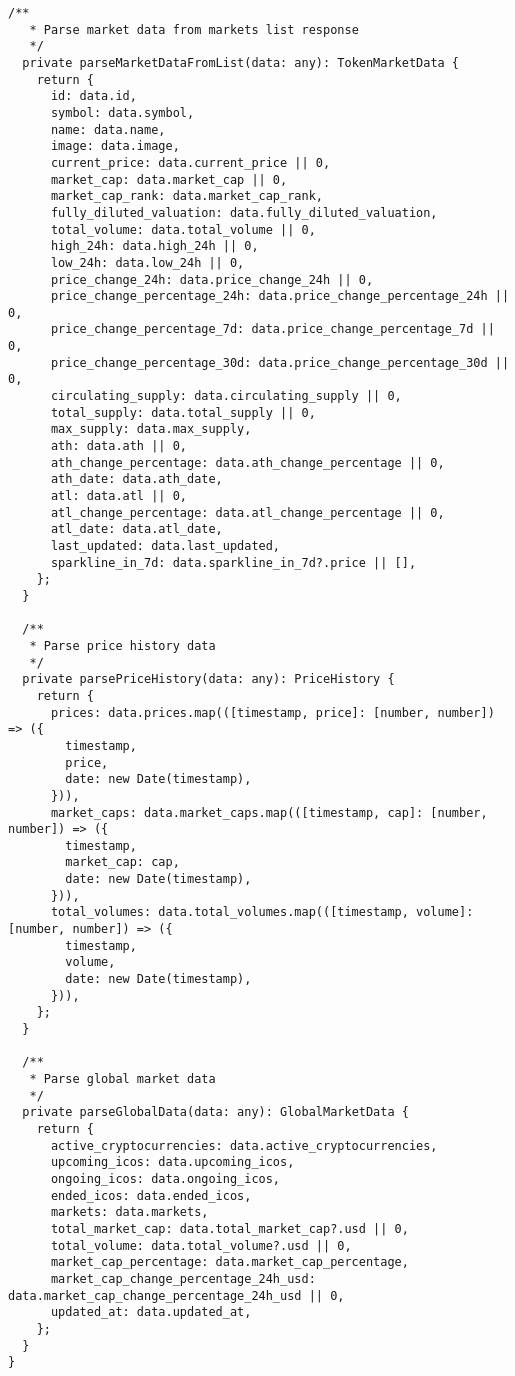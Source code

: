 \documentclass[11pt,a4paper]{article}
\begin{document}
\begin{lstlisting}[style=typescript, caption=CoinGecko Service for Market Data]
  /**
   * Parse market data from markets list response
   */
  private parseMarketDataFromList(data: any): TokenMarketData {
    return {
      id: data.id,
      symbol: data.symbol,
      name: data.name,
      image: data.image,
      current_price: data.current_price || 0,
      market_cap: data.market_cap || 0,
      market_cap_rank: data.market_cap_rank,
      fully_diluted_valuation: data.fully_diluted_valuation,
      total_volume: data.total_volume || 0,
      high_24h: data.high_24h || 0,
      low_24h: data.low_24h || 0,
      price_change_24h: data.price_change_24h || 0,
      price_change_percentage_24h: data.price_change_percentage_24h || 0,
      price_change_percentage_7d: data.price_change_percentage_7d || 0,
      price_change_percentage_30d: data.price_change_percentage_30d || 0,
      circulating_supply: data.circulating_supply || 0,
      total_supply: data.total_supply || 0,
      max_supply: data.max_supply,
      ath: data.ath || 0,
      ath_change_percentage: data.ath_change_percentage || 0,
      ath_date: data.ath_date,
      atl: data.atl || 0,
      atl_change_percentage: data.atl_change_percentage || 0,
      atl_date: data.atl_date,
      last_updated: data.last_updated,
      sparkline_in_7d: data.sparkline_in_7d?.price || [],
    };
  }

  /**
   * Parse price history data
   */
  private parsePriceHistory(data: any): PriceHistory {
    return {
      prices: data.prices.map(([timestamp, price]: [number, number]) => ({
        timestamp,
        price,
        date: new Date(timestamp),
      })),
      market_caps: data.market_caps.map(([timestamp, cap]: [number, number]) => ({
        timestamp,
        market_cap: cap,
        date: new Date(timestamp),
      })),
      total_volumes: data.total_volumes.map(([timestamp, volume]: [number, number]) => ({
        timestamp,
        volume,
        date: new Date(timestamp),
      })),
    };
  }

  /**
   * Parse global market data
   */
  private parseGlobalData(data: any): GlobalMarketData {
    return {
      active_cryptocurrencies: data.active_cryptocurrencies,
      upcoming_icos: data.upcoming_icos,
      ongoing_icos: data.ongoing_icos,
      ended_icos: data.ended_icos,
      markets: data.markets,
      total_market_cap: data.total_market_cap?.usd || 0,
      total_volume: data.total_volume?.usd || 0,
      market_cap_percentage: data.market_cap_percentage,
      market_cap_change_percentage_24h_usd: data.market_cap_change_percentage_24h_usd || 0,
      updated_at: data.updated_at,
    };
  }
}
\end{lstlisting}
\end{document}
